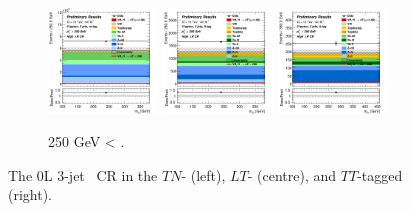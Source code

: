\begin{figure}[h!]
\begin{subfigure}[b]{\textwidth}
        \includegraphics[width=0.32\textwidth]{Images/VH/Own_fit/prefit_VHcc/Region_distmBB_BMin250_DCRHigh_J3_TTypent_T1_L0_Y6051_Prefit.png}
        \includegraphics[width=0.32\textwidth]{Images/VH/Own_fit/prefit_VHcc/Region_distmBB_BMin250_DCRHigh_J3_TTypelt_T2_L0_Y6051_Prefit.png}
        \includegraphics[width=0.32\textwidth]{Images/VH/Own_fit/prefit_VHcc/Region_distmBB_BMin250_DCRHigh_J3_TTypett_T2_L0_Y6051_Prefit.png}
        \caption{250 GeV < \ptv.}
        \label{fig:plots_VHcc_OL_250_CRH_2c_3J}
    \end{subfigure}
    \caption{The 0L 3-jet \highdr\ CR in the $TN$- (left), $LT$- (centre), and $TT$-tagged (right).}
    \label{fig:plots_VHcc_OL_CRH_2c_3J}
\end{figure} 

\vspace*{\fill} 

